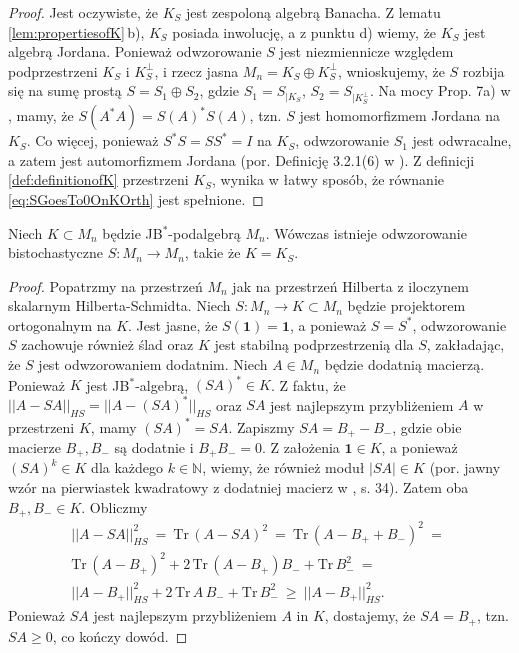{\begin{proof}
Jest oczywiste, że $K_{S}$ jest zespoloną algebrą Banacha.
Z lematu \ref{lem:propertiesofK}\,b),
$K_{S}$ posiada inwolucję,
a z punktu d) wiemy, że $K_{S}$ jest algebrą Jordana.
Ponieważ odwzorowanie $S$ jest niezmiennicze względem podprzestrzeni
$K_{S}$ i $K_{S}^{\perp}$,
i rzecz jasna $M_{n} = K_{S} \oplus K_{S}^{\perp}$,
wnioskujemy, że $S$ rozbija się na sumę prostą
$S = S_{1} \oplus S_{2}$,
gdzie $S_{1} = S_{| K_{S}}$, $S_{2} = S_{| K_{S}^{\perp}}$.
Na mocy Prop. 7a) w \cite{olkiewicz1999environment},
mamy, że $S(A^{*} A) = S(A)^{*} S(A)$,
tzn. $S$ jest homomorfizmem Jordana na $K_{S}$.
Co więcej, ponieważ $S^{*} S = S S^{*} = I$ na $K_{S}$,
odwzorowanie $S_{1}$ jest odwracalne,
a zatem jest automorfizmem Jordana
(por. Definicję 3.2.1(6) w \cite{Bratteli2003}).
Z definicji \eqref{def:definitionofK} przestrzeni $K_{S}$,
wynika w łatwy sposób, że
równanie \eqref{eq:SGoesTo0OnKOrth} jest spełnione.
\end{proof}

\begin{Theorem}
\label{thm:FromESbook}
Niech $K \subset M_{n}$ będzie JB$^{*}$-podalgebrą $M_{n}$.
Wówczas istnieje odwzorowanie bistochastyczne
$S \! : M_{n} \rightarrow M_{n}$, takie że $K = K_{S}$.
\end{Theorem}
\begin{proof}
Popatrzmy na przestrzeń $M_{n}$ jak na przestrzeń Hilberta z iloczynem skalarnym
Hilberta-Schmidta.
Niech $S\!: M_{n} \rightarrow K \subset M_{n}$ będzie
projektorem ortogonalnym na $K$.
Jest jasne, że $S(\mathbf{1}) = \mathbf{1}$,
a ponieważ $S = S^{*}$,
odwzorowanie $S$ zachowuje również ślad oraz
$K$ jest stabilną podprzestrzenią dla $S$,
zakładając, że $S$ jest odwzorowaniem dodatnim.
Niech $A \in M_{n}$  będzie dodatnią macierzą.
Ponieważ $K$ jest JB$^{*}$-algebrą,
$(SA)^{*} \in K$.
Z faktu, że
$|| A - SA ||_{HS} = || A - (SA)^{*} ||_{HS}$
oraz $SA$ jest najlepszym przybliżeniem $A$ w przestrzeni $K$,
mamy $(SA)^{*} = SA$.
Zapiszmy $SA = B_{+} - B_{-}$,
gdzie obie macierze $B_{+}, B_{-}$ są dodatnie i
$B_{+} B_{-} = 0$.
Z założenia $\mathbf{1} \in K$,
a ponieważ $(SA)^{k} \in K$ dla każdego $k \in \mathbb{N}$,
wiemy, że również moduł $|S A| \in K$
(por. jawny wzór na pierwiastek kwadratowy z dodatniej macierz w
\cite{Bratteli2003}, s. 34).
Zatem oba $B_{+}, B_{-} \in K$.
Obliczmy
\begin{multline}
|| A - SA ||_{HS}^{2} \: = \: \text{Tr} \, ( A - SA )^{2} \: = \:
    \text{Tr} \, ( A - B_{+} + B_{-} )^{2} \: = \: \\
    \text{Tr} \, ( A - B_{+} )^{2} +
        2 \, \text{Tr} \, ( A - B_{+} ) B_{-} + \text{Tr} \, B_{-}^{2}
            \: = \: \\
    || A - B_{+} ||_{HS}^{2} +
        2 \, \text{Tr} \,  A \, B_{-}+ \text{Tr} \, B_{-}^{2}
    \: \geq \: || A - B_{+} ||_{HS}^{2}.
\end{multline}
Ponieważ $SA$ jest najlepszym przybliżeniem $A$ in $K$,
dostajemy, że $SA = B_{+}$, tzn. $SA \geq 0$, co kończy dowód.
\end{proof}


}
